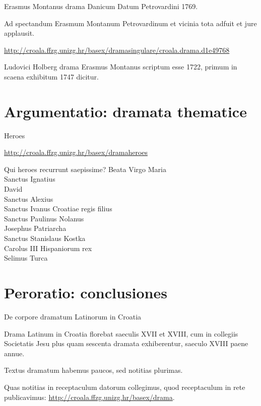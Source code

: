 \documentclass[14pt]{beamer}
\begin{document}
\begin{frame}{Erasmus Montanus drama Danicum}
  Datum Petrovardini 1769.

  Ad spectandum Erasmum Montanum Petrovardinum et vicinia tota adfuit et jure applausit.
  
  \url{http://croala.ffzg.unizg.hr/basex/dramasingulare/croala.drama.d1e49768}

  Ludovici Holberg drama Erasmus Montanus scriptum esse 1722, primum in scaena exhibitum 1747 dicitur.
    \end{frame}

\section{Argumentatio: dramata thematice}

\begin{frame}
  Heroes

  \url{http://croala.ffzg.unizg.hr/basex/dramaheroes}
  
\end{frame}

\begin{frame}{Qui heroes recurrunt saepissime?}
  Beata Virgo Maria\\
  Sanctus Ignatius\\
  David\\
  Sanctus Alexius\\
  Sanctus Ivanus Croatiae regis filius\\
  Sanctus Paulinus Nolanus\\
  Josephus Patriarcha\\
  Sanctus Stanislaus Kostka\\
  Carolus III Hispaniorum rex\\
  Selimus Turca
  
\end{frame}

\section{Peroratio: conclusiones}

\begin{frame}{De corpore dramatum Latinorum in Croatia}

  Drama Latinum in Croatia florebat \alert{saeculis XVII et XVIII}, cum in collegiis Societatis Jesu \alert{plus quam sescenta dramata} exhiberentur, saeculo XVIII paene annue.

  Textus dramatum habemus paucos, sed notitias plurimas.

  Quas notitias in \alert{receptaculum datorum} collegimus, quod receptaculum in rete publicavimus: \url{http://croala.ffzg.unizg.hr/basex/drama}.
  
\end{frame}
\end{document}
